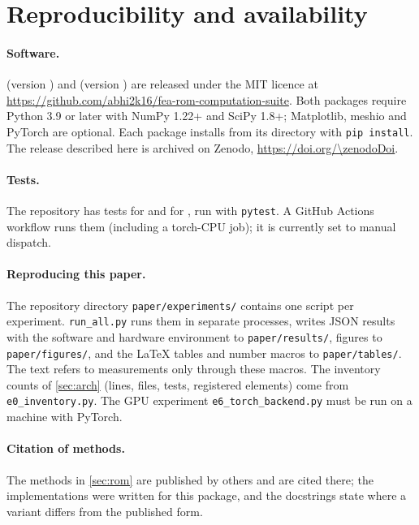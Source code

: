 \section{Reproducibility and availability}\label{sec:avail}

\paragraph{Software.}
\fea{} (version \feaVersion{}) and \rom{} (version \romVersion{}) are released under the MIT licence at \url{https://github.com/abhi2k16/fea-rom-computation-suite}. Both packages require Python 3.9 or later with NumPy 1.22+ and SciPy 1.8+; Matplotlib, meshio and PyTorch are optional.
Each package installs from its directory with \texttt{pip install}. \ifx\zenodoDoi\noDoi{}\else The release described here is archived on Zenodo, \url{https://doi.org/\zenodoDoi}.\fi

\paragraph{Tests.}
The repository has \feaTests{} tests for \fea{} and \romTests{} for \rom{}, run with \texttt{pytest}. A GitHub Actions workflow runs them (including a torch-CPU job); it is currently set to manual dispatch.

\paragraph{Reproducing this paper.}
The repository directory \texttt{paper/experiments/} contains one script per experiment. \texttt{run\_all.py} runs them in separate processes, writes JSON results with the software and hardware environment to \texttt{paper/results/}, figures to \texttt{paper/figures/}, and the LaTeX tables and number macros to \texttt{paper/tables/}.
The text refers to measurements only through these macros. The inventory counts of \cref{sec:arch} (lines, files, tests, registered elements) come from \texttt{e0\_inventory.py}. The GPU experiment \texttt{e6\_torch\_backend.py} must be run on a machine with PyTorch.

\paragraph{Citation of methods.}
The methods in \cref{sec:rom} are published by others and are cited there; the implementations were written for this package, and the docstrings state where a variant differs from the published form.

